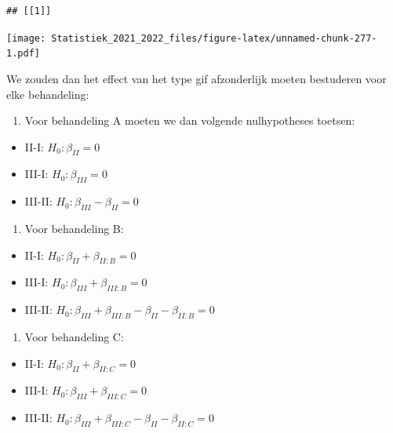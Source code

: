 \documentclass[
  12pt,dutch,coursenotes]{book}
\providecommand{\tightlist}{%
  \setlength{\itemsep}{0pt}\setlength{\parskip}{0pt}}
\theoremstyle{definition}
\theoremstyle{definition}
\theoremstyle{definition}
\theoremstyle{definition}
\theoremstyle{remark}
\begin{document}
\begin{lstlisting}
## [[1]]
\end{lstlisting}

\texttt{[image: Statistiek\_2021\_2022\_files/figure-latex/unnamed-chunk-277-1.pdf]}

We zouden dan het effect van het type gif afzonderlijk moeten bestuderen voor elke behandeling:

\begin{enumerate}
\def\labelenumi{\arabic{enumi}.}
\tightlist
\item
  Voor behandeling A moeten we dan volgende nulhypotheses toetsen:
\end{enumerate}

\begin{itemize}
\tightlist
\item
  II-I: \(H_0: \beta_{II}=0\)
\item
  III-I: \(H_0: \beta_{III}=0\)
\item
  III-II: \(H_0: \beta_{III}-\beta_{II}=0\)
\end{itemize}

\begin{enumerate}
\def\labelenumi{\arabic{enumi}.}
\setcounter{enumi}{1}
\tightlist
\item
  Voor behandeling B:
\end{enumerate}

\begin{itemize}
\tightlist
\item
  II-I: \(H_0: \beta_{II}+\beta_{II:B}=0\)
\item
  III-I: \(H_0: \beta_{III}+\beta_{III:B}=0\)
\item
  III-II: \(H_0: \beta_{III}+\beta_{III:B}-\beta_{II}-\beta_{II:B}=0\)
\end{itemize}

\begin{enumerate}
\def\labelenumi{\arabic{enumi}.}
\setcounter{enumi}{2}
\tightlist
\item
  Voor behandeling C:
\end{enumerate}

\begin{itemize}
\tightlist
\item
  II-I: \(H_0: \beta_{II}+\beta_{II:C}=0\)
\item
  III-I: \(H_0: \beta_{III}+\beta_{III:C}=0\)
\item
  III-II: \(H_0: \beta_{III}+\beta_{III:C}-\beta_{II}-\beta_{II:C}=0\)
\end{itemize}
\end{document}

